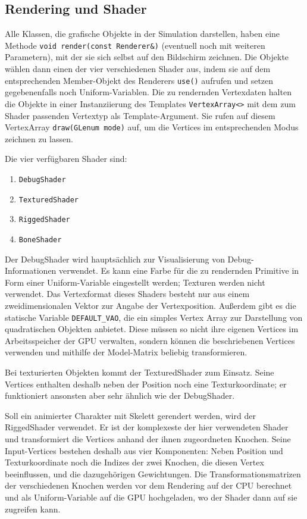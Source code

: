 \subsection{Rendering und Shader} \label{rendering_section}
Alle Klassen, die grafische Objekte in der Simulation darstellen, haben eine Methode \lstinline{void render(const Renderer&)} (eventuell noch mit weiteren Parametern), mit der sie sich selbst auf den Bildschirm zeichnen. Die Objekte wählen dann einen der vier verschiedenen Shader aus, indem sie auf dem entsprechenden Member-Objekt des Renderers \lstinline{use()} aufrufen und setzen gegebenenfalls noch Uniform-Variablen. Die zu rendernden Vertexdaten halten die Objekte in einer Instanziierung des Templates \lstinline{VertexArray<>} mit dem zum Shader passenden Vertextyp als Template-Argument. Sie rufen auf diesem VertexArray \lstinline{draw(GLenum mode)} auf, um die Vertices im entsprechenden Modus zeichnen zu lassen.

Die vier verfügbaren Shader sind:
\begin{enumerate}
    \item \lstinline{DebugShader}
    \item \lstinline{TexturedShader}
    \item \lstinline{RiggedShader}
    \item \lstinline{BoneShader}
\end{enumerate}

Der DebugShader wird hauptsächlich zur Visualisierung von Debug-Informationen verwendet. Es kann eine Farbe für die zu rendernden Primitive in Form einer Uniform-Variable eingestellt werden; Texturen werden nicht verwendet. Das Vertexformat dieses Shaders besteht nur aus einem zweidimensionalen Vektor zur Angabe der Vertexposition. Außerdem gibt es die statische Variable \lstinline{DEFAULT_VAO}, die ein simples Vertex Array zur Darstellung von quadratischen Objekten anbietet. Diese müssen so nicht ihre eigenen Vertices im Arbeitsspeicher der GPU verwalten, sondern können die beschriebenen Vertices verwenden und mithilfe der Model-Matrix beliebig transformieren.

Bei texturierten Objekten kommt der TexturedShader zum Einsatz. Seine Vertices enthalten deshalb neben der Position noch eine Texturkoordinate; er funktioniert ansonsten aber sehr ähnlich wie der DebugShader.

Soll ein animierter Charakter mit Skelett gerendert werden, wird der RiggedShader verwendet. Er ist der komplexeste der hier verwendeten Shader und transformiert die Vertices anhand der ihnen zugeordneten Knochen. Seine Input-Vertices bestehen deshalb aus vier Komponenten: Neben Position und Texturkoordinate noch die Indizes der zwei Knochen, die diesen Vertex beeinflussen, und die dazugehörigen Gewichtungen. Die Transformationsmatrizen der verschiedenen Knochen werden vor dem Rendering auf der CPU berechnet und als Uniform-Variable auf die GPU hochgeladen, wo der Shader dann auf sie zugreifen kann.

